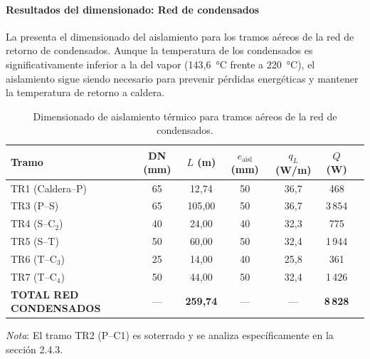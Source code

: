 \documentclass[12pt]{article}
\begin{document}
\paragraph{Resultados del dimensionado: Red de condensados}
\label{par:resultados_cond_aereo}

La  presenta el dimensionado del aislamiento para los tramos aéreos de la red de retorno de condensados. Aunque la temperatura de los condensados es significativamente inferior a la del vapor (143{,}6~°C frente a 220~°C), el aislamiento sigue siendo necesario para prevenir pérdidas energéticas y mantener la temperatura de retorno a caldera.

\begin{table}[htbp]
	\centering
	\caption{Dimensionado de aislamiento térmico para tramos aéreos de la red de condensados.}
	\label{tab:aislamiento_cond_aereo}
	\begin{tabular}{lcccccc}
		\toprule
		\textbf{Tramo}                 & \textbf{DN (mm)} & \textbf{$L$ (m)}  & \textbf{$e_{\text{aisl}}$ (mm)} & \textbf{$q_L$ (W/m)} & \textbf{$Q$ (W)} \\
		\midrule
		TR1 (Caldera--P)               & 65               & 12{,}74           & 50                              & 36{,}7               & 468              \\
		TR3 (P--S)                     & 65               & 105{,}00          & 50                              & 36{,}7               & 3\,854           \\
		TR4 (S--C$_2$)                 & 40               & 24{,}00           & 40                              & 32{,}3               & 775              \\
		TR5 (S--T)                     & 50               & 60{,}00           & 50                              & 32{,}4               & 1\,944           \\
		TR6 (T--C$_3$)                 & 25               & 14{,}00           & 40                              & 25{,}8               & 361              \\
		TR7 (T--C$_4$)                 & 50               & 44{,}00           & 50                              & 32{,}4               & 1\,426           \\
		\midrule
		\textbf{TOTAL RED CONDENSADOS} & ---              & \textbf{259{,}74} & ---                             & ---                  & \textbf{8\,828}  \\
		\bottomrule
	\end{tabular}
	\vspace{0.3cm}

	\noindent \small \textit{Nota}: El tramo TR2 (P--C1) es soterrado y se analiza específicamente en la sección 2.4.3.
\end{table}
\end{document}

